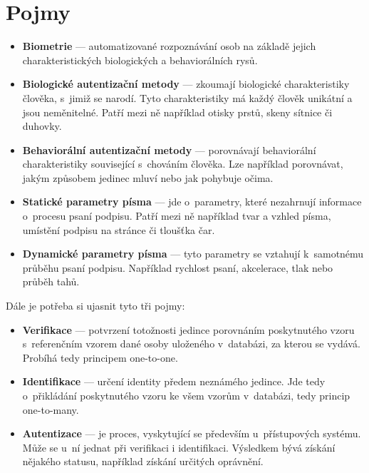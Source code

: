 \section{Pojmy}\label{sec:pojmy}
\begin{itemize} 
  \item \textbf{Biometrie} --- automatizované rozpoznávání osob na základě jejich charakteristických biologických a behaviorálních rysů.~\cite{DrahanskýMartin2011} %
  \item \textbf{Biologické autentizační metody} --- zkoumají biologické charakteristiky člověka, s~jimiž se narodí. Tyto charakteristiky má každý člověk unikátní a jsou neměnitelné. Patří mezi ně například otisky prstů, skeny sítnice či duhovky.  
  \item \textbf{Behaviorální autentizační metody} --- porovnávají behaviorální charakteristiky související s~chováním člověka. Lze například porovnávat, jakým způsobem jedinec mluví nebo jak pohybuje očima.
  \item \textbf{Statické parametry písma} --- jde o~parametry, které nezahrnují informace o~procesu psaní podpisu. Patří mezi ně například tvar a vzhled písma, umístění podpisu na stránce či tloušťka čar.
  \item \textbf{Dynamické parametry písma} --- tyto parametry se vztahují k~samotnému průběhu psaní podpisu. Například rychlost psaní, akcelerace, tlak nebo průběh tahů.
\end{itemize}
Dále je potřeba si ujasnit tyto tři pojmy:
\begin{itemize}
  \item \textbf{Verifikace} --- potvrzení totožnosti jedince porovnáním poskytnutého vzoru s~referenčním vzorem dané osoby uloženého v~databázi, %
  za kterou se vydává. Probíhá tedy principem one-to-one.                                                                                     %
  \item \textbf{Identifikace} --- určení identity předem neznámého jedince.                                                                       %
  Jde tedy o~přikládání poskytnutého vzoru ke všem vzorům v~databázi, tedy princip one-to-many.                                                %
  \item \textbf{Autentizace} --- je proces, vyskytující se především u~přístupových systému.                                                      %
  Může se u~ní jednat při verifikaci i identifikaci.                                                                                            %
  Výsledkem bývá získání nějakého statusu, například získání určitých oprávnění.~\cite{Scurek2015}                                                        %
\end{itemize}

